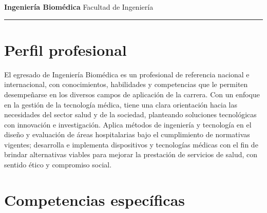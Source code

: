\documentclass[10pt,letterpaper]{article}
\begin{document}
{\color{unitecblue}\Huge\bfseries Ingeniería Biomédica}\hfill
{\Large Facultad de Ingeniería}

\vspace{4pt}\hrule\vspace{10pt}

\section*{Perfil profesional}

El egresado de Ingeniería Biomédica es un profesional de referencia nacional e
internacional, con conocimientos, habilidades y competencias que le permiten
desempeñarse en los diversos campos de aplicación de la carrera. Con un enfoque
en la gestión de la tecnología médica, tiene una clara orientación hacia las
necesidades del sector salud y de la sociedad, planteando soluciones tecnológicas
con innovación e investigación. Aplica métodos de ingeniería y tecnología en el
diseño y evaluación de áreas hospitalarias bajo el cumplimiento de normativas
vigentes; desarrolla e implementa dispositivos y tecnologías médicas con el fin
de brindar alternativas viables para mejorar la prestación de servicios de salud,
con sentido ético y compromiso social.

\section*{Competencias específicas}
\end{document}
